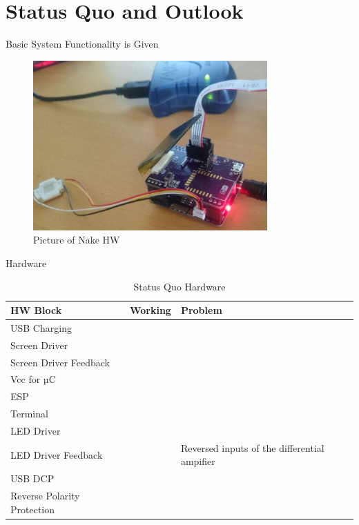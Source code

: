 \documentclass[apectratio=169]{beamer}
\begin{document}
  \section{Status Quo and Outlook}
	\begin{frame}{Basic System Functionality is Given}
	\begin{figure}
        	\centering
                \includegraphics[width=0.8\textwidth]{./fig/demo}
                \caption{Picture of Nake HW}
        \end{figure}
	\end{frame}


	\begin{frame}{Hardware} \footnotesize \begin{table}[H] \centering
		\begin{tabularx}{\textwidth}{llX} \textbf{HW Block} &
			\textbf{Working}& \textbf{Problem} \\\hline USB Charging
			& \checkmark & \\ Screen Driver & \checkmark & \\ Screen
			Driver Feedback& \checkmark & \\ Vcc for µC & \checkmark
			& \\ ESP & \checkmark & \\ Terminal & \checkmark & \\
			LED Driver & \checkmark & \\ LED Driver Feedback & &
			Reversed inputs of the differential ampifier \\ USB DCP
			& \checkmark & \\ Reverse Polarity Protection &
		\checkmark & \\ \hline \end{tabularx} \caption{Status Quo
	Hardware} \label{tab:hw_status_quo} \end{table} \end{frame}
\end{document}
